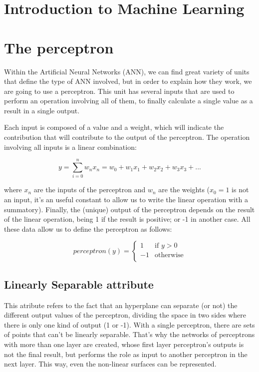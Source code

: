 \section{Introduction to Machine Learning}


\section{The perceptron}
Within the Artificial Neural Networks (ANN), we can find great variety of units that define the type of ANN involved, but in order to explain how they work, we are going to use a perceptron. This unit has several inputs that are used to perform an operation involving all of them, to finally calculate a single value as a result in a single output.

	Each input is composed of a value and a weight, which will indicate the contribution that will contribute to the output of the perceptron. The operation involving all inputs is a linear combination:

	\begin{equation}
	    \label{linear_combination}
	        y=\sum_{i=0}^{n} w_n x_n = w_0 + w_1 x_1 + w_2 x_2 + w_3 x_3 + ...%
	\end{equation}

	where $x_n$ are the inputs of the perceptron and $w_n$ are the weights ($x_0=1$ is not an input, it's an useful constant to allow us to write the linear operation with a summatory). Finally, the (unique) output of the perceptron depends on the result of the linear operation, being 1 if the result is positive; or -1 in another case. All these data allow us to define the perceptron as follows:

	\begin{equation}
	    \label{perceptron_rule}
		perceptron(y) =
			\begin{cases}
		     	1 & \text{if $y>0$} \\
		        -1 & \text{otherwise} \\
			\end{cases}
	\end{equation}

	\subsection{Linearly Separable attribute}
	This atribute refers to the fact that an hyperplane can separate (or not) the different output values of the perceptron, dividing the space in two sides where there is only one kind of output (1 or -1). With a single perceptron, there are sets of points that can't be linearly separable. That's why the networks of perceptrons with more than one layer are created, whose first layer perceptron's outputs is not the final result, but performs the role as input to another perceptron in the next layer. This way, even the non-linear surfaces can be represented.


